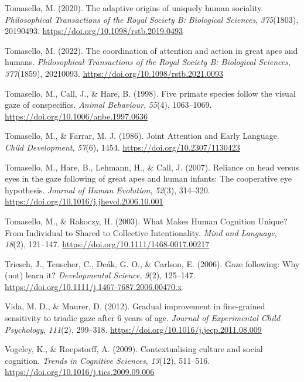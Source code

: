 \documentclass[
]{scrbook}
\newlength{\cslhangindent}
\newenvironment{CSLReferences}[2] %
 {\begin{list}{}{%
  \setlength{\itemindent}{0pt}
  \setlength{\leftmargin}{0pt}
  \setlength{\parsep}{0pt}
  \ifodd #1
   \setlength{\leftmargin}{\cslhangindent}
   \setlength{\itemindent}{-1\cslhangindent}
  \fi
  \setlength{\itemsep}{#2\baselineskip}}}
 {\end{list}}
\begin{document}
\begin{CSLReferences}{1}{0}
Tomasello, M. (2020). The adaptive origins of uniquely human sociality. \emph{Philosophical Transactions of the Royal Society B: Biological Sciences}, \emph{375}(1803), 20190493. \url{https://doi.org/10.1098/rstb.2019.0493}

Tomasello, M. (2022). The coordination of attention and action in great apes and humans. \emph{Philosophical Transactions of the Royal Society B: Biological Sciences}, \emph{377}(1859), 20210093. \url{https://doi.org/10.1098/rstb.2021.0093}

Tomasello, M., Call, J., \& Hare, B. (1998). Five primate species follow the visual gaze of conspecifics. \emph{Animal Behaviour}, \emph{55}(4), 1063--1069. \url{https://doi.org/10.1006/anbe.1997.0636}

Tomasello, M., \& Farrar, M. J. (1986). Joint {Attention} and {Early Language}. \emph{Child Development}, \emph{57}(6), 1454. \url{https://doi.org/10.2307/1130423}

Tomasello, M., Hare, B., Lehmann, H., \& Call, J. (2007). Reliance on head versus eyes in the gaze following of great apes and human infants: The cooperative eye hypothesis. \emph{Journal of Human Evolution}, \emph{52}(3), 314--320. \url{https://doi.org/10.1016/j.jhevol.2006.10.001}

Tomasello, M., \& Rakoczy, H. (2003). What {Makes Human Cognition Unique}? {From Individual} to {Shared} to {Collective Intentionality}. \emph{Mind and Language}, \emph{18}(2), 121--147. \url{https://doi.org/10.1111/1468-0017.00217}

Triesch, J., Teuscher, C., Deák, G. O., \& Carlson, E. (2006). Gaze following: Why (not) learn it? \emph{Developmental Science}, \emph{9}(2), 125--147. \url{https://doi.org/10.1111/j.1467-7687.2006.00470.x}

Vida, M. D., \& Maurer, D. (2012). Gradual improvement in fine-grained sensitivity to triadic gaze after 6 years of age. \emph{Journal of Experimental Child Psychology}, \emph{111}(2), 299--318. \url{https://doi.org/10.1016/j.jecp.2011.08.009}

Vogeley, K., \& Roepstorff, A. (2009). Contextualising culture and social cognition. \emph{Trends in Cognitive Sciences}, \emph{13}(12), 511--516. \url{https://doi.org/10.1016/j.tics.2009.09.006}


\end{CSLReferences}
\end{document}
